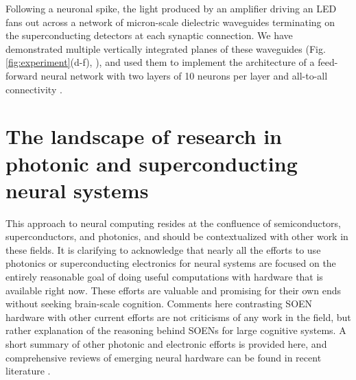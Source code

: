 \documentclass[twocolumn]{article}
\begin{document}
Following a neuronal spike, the light produced by an amplifier driving an LED fans out across a network of micron-scale dielectric waveguides terminating on the superconducting detectors at each synaptic connection. We have demonstrated multiple vertically integrated planes of these waveguides (Fig.\,\ref{fig:experiment}(d-f), \cite{chbu2017}), and used them to implement the architecture of a feed-forward neural network with two layers of 10 neurons per layer and all-to-all connectivity \cite{chbu2018}.

\section{\label{sec:other_approaches}The landscape of research in photonic and superconducting neural systems}
This approach to neural computing resides at the confluence of semiconductors, superconductors, and photonics, and should be contextualized with other work in these fields. It is clarifying to acknowledge that nearly all the efforts to use photonics or superconducting electronics for neural systems are focused on the entirely reasonable goal of doing useful computations with hardware that is available right now. These efforts are valuable and promising for their own ends without seeking brain-scale cognition. Comments here contrasting SOEN hardware with other current efforts are not criticisms of any work in the field, but rather explanation of the reasoning behind SOENs for large cognitive systems. A short summary of other photonic and electronic efforts is provided here, and comprehensive reviews of emerging neural hardware can be found in recent literature \cite{scpo2017,bexi2020,shta2021}.
\end{document}
